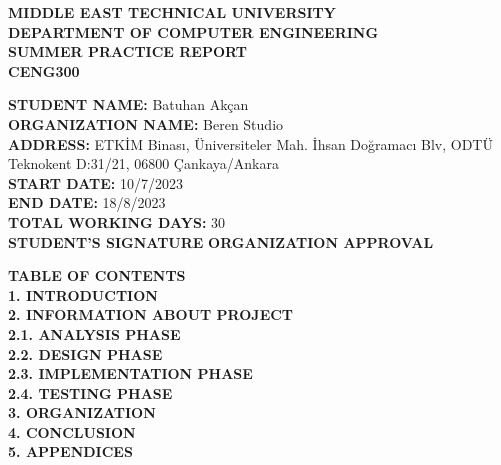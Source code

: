 \documentclass[a4paper]{article}
\begin{document}
\begin{center}
\textbf{\large MIDDLE EAST TECHNICAL UNIVERSITY}
\vspace{0.5cm}\\
\textbf{\large DEPARTMENT OF COMPUTER ENGINEERING}
\vspace{2cm}\\
\textbf{\huge SUMMER PRACTICE REPORT}
\vspace{0.5cm}\\
\textbf{\huge CENG300}
\end{center}
\vspace{2cm}

\noindent
\textbf{STUDENT NAME:} Batuhan Akçan \vspace{0.5cm}\\
\textbf{ORGANIZATION NAME:} Beren Studio \vspace{0.5cm}\\
\textbf{ADDRESS:} ETKİM Binası, Üniversiteler Mah. İhsan Doğramacı Blv, ODTÜ Teknokent D:31/21, 06800 Çankaya/Ankara \vspace{0.5cm}\\
\textbf{START DATE:} 10/7/2023 \vspace{0.5cm}\\
\textbf{END DATE:} 18/8/2023 \vspace{0.5cm}\\
\textbf{TOTAL WORKING DAYS:} 30 \vspace{2cm}\\

\noindent
\textbf{STUDENT'S SIGNATURE} \hspace{1.5cm} \textbf{ORGANIZATION APPROVAL}

\newpage

\textbf{TABLE OF CONTENTS}\vspace{1cm}\\
\textbf{1. INTRODUCTION}\\
\textbf{2. INFORMATION ABOUT PROJECT}\\
\indent\textbf{2.1. ANALYSIS PHASE}\\
\indent\textbf{2.2. DESIGN PHASE}\\
\indent\textbf{2.3. IMPLEMENTATION PHASE}\\
\indent\textbf{2.4. TESTING PHASE}\\
\textbf{3. ORGANIZATION}\\
\textbf{4. CONCLUSION}\\
\textbf{5. APPENDICES}

\newpage
\end{document}
